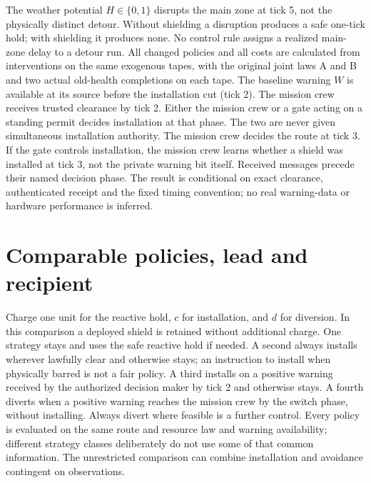 \documentclass[11pt]{article}
\begin{document}
The weather potential $H\in\{0,1\}$ disrupts the main zone at tick 5,
not the physically distinct detour. Without shielding a disruption
produces a safe one-tick hold; with shielding it produces none.
No control rule assigns a realized main-zone delay to a detour run.
All changed policies and all costs are calculated from interventions
on the same exogenous tapes, with the original joint laws A and B and
two actual old-health completions on each tape. The baseline warning
$W$ is available at its source before the installation cut (tick 2).
The mission crew receives trusted clearance by tick 2. Either the
mission crew or a gate acting on a standing permit decides installation
at that phase. The two are never given simultaneous installation
authority. The mission crew decides the route at tick 3. If the gate
controls installation, the mission crew learns whether a shield was
installed at tick 3, not the private warning bit itself. Received
messages precede their named decision phase. The result is conditional
on exact clearance, authenticated receipt and the fixed timing
convention; no real warning-data or hardware performance is inferred.

\section{Comparable policies, lead and recipient}
Charge one unit for the reactive hold, $c$ for installation, and $d$ for
diversion. In this comparison a deployed shield is retained without
additional charge. One strategy stays and uses the safe reactive hold
if needed. A second always installs wherever lawfully clear and otherwise
stays; an instruction to install when physically barred is not a fair
policy. A third installs on a positive warning received by the
authorized decision maker by tick 2 and otherwise stays. A fourth
diverts when a positive warning reaches the mission crew by the switch
phase, without installing. Always divert where feasible is a further
control. Every policy is evaluated on the same route and resource law
and warning availability; different strategy classes deliberately do not
use some of that common information. The unrestricted comparison can
combine installation and avoidance contingent on observations.
\end{document}
